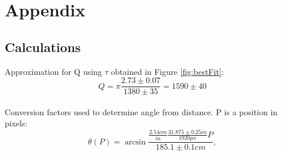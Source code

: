 \documentclass[11pt]{article}
\begin{document}
    \section{Appendix}
        \subsection{Calculations}\label{app:Calc}
            Approximation for Q using $\tau$ obtained in Figure \ref{fig:bestFit}:
            \begin{equation}
                Q = \pi\frac{2.73\pm0.07}{1380 \pm 35} = 1590 \pm 40
                \label{calc:tauApprox}
            \end{equation}
            \\
            Conversion factors used to determine angle from distance. P is a position in pixels:
            \begin{equation}
                \theta(P) = \arcsin{\frac{\frac{2.54cm}{in}\frac{31.875 \pm 0.25in}{1920px} P}{185.1 \pm 0.1cm}}, 
                \label{calc:thetaApprox}
            \end{equation}
\end{document}
